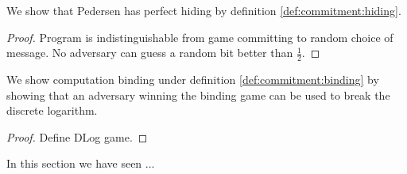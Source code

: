 \begin{lemma}
  We show that Pedersen has perfect hiding by definition
  \ref{def:commitment:hiding}.
\end{lemma}
\begin{proof}
  Program is indistinguishable from game committing to random choice of message.
  No adversary can guess a random bit better than $\frac{1}{2}$.
\end{proof}

\begin{lemma}
  We show computation binding under definition \ref{def:commitment:binding} by
  showing that an adversary winning the binding game can be used to break the
  discrete logarithm.
\end{lemma}
\begin{proof}
  Define DLog game.
\end{proof}

In this section we have seen ...

